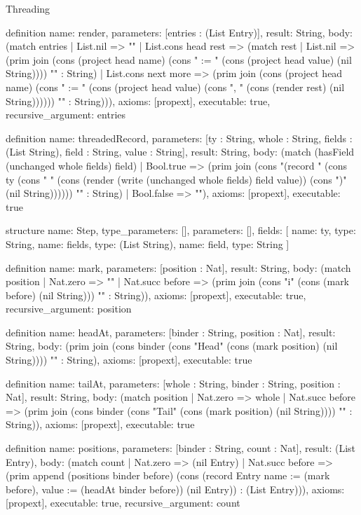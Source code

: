 \begin{lexlean}{Threading}
\begin{semanticmodule}
definition{
  name: render,
  parameters: [entries : (List Entry)],
  result: String,
  body: (match entries
    | List.nil => ""
    | List.cons head rest => (match rest
      | List.nil => (prim join (cons (project head name) (cons " := " (cons (project head value) (nil String)))) "" : String)
      | List.cons next more => (prim join (cons (project head name) (cons " := " (cons (project head value) (cons ", " (cons (render rest) (nil String)))))) "" : String))),
  axioms: [propext],
  executable: true,
  recursive_argument: entries
}

definition{
  name: threadedRecord,
  parameters: [ty : String, whole : String, fields : (List String), field : String, value : String],
  result: String,
  body: (match (hasField (unchanged whole fields) field)
    | Bool.true => (prim join (cons "(record " (cons ty (cons " {" (cons (render (write (unchanged whole fields) field value)) (cons "})" (nil String)))))) "" : String)
    | Bool.false => ""),
  axioms: [propext],
  executable: true
}

structure{
  name: Step,
  type_parameters: [],
  parameters: [],
  fields: [
    {name: ty, type: String},
    {name: fields, type: (List String)},
    {name: field, type: String}
  ]
}

definition{
  name: mark,
  parameters: [position : Nat],
  result: String,
  body: (match position
    | Nat.zero => ""
    | Nat.succ before => (prim join (cons "i" (cons (mark before) (nil String))) "" : String)),
  axioms: [propext],
  executable: true,
  recursive_argument: position
}

definition{
  name: headAt,
  parameters: [binder : String, position : Nat],
  result: String,
  body: (prim join (cons binder (cons "Head" (cons (mark position) (nil String)))) "" : String),
  axioms: [propext],
  executable: true
}

definition{
  name: tailAt,
  parameters: [whole : String, binder : String, position : Nat],
  result: String,
  body: (match position
    | Nat.zero => whole
    | Nat.succ before => (prim join (cons binder (cons "Tail" (cons (mark position) (nil String)))) "" : String)),
  axioms: [propext],
  executable: true
}

definition{
  name: positions,
  parameters: [binder : String, count : Nat],
  result: (List Entry),
  body: (match count
    | Nat.zero => (nil Entry)
    | Nat.succ before => (prim append (positions binder before) (cons (record Entry {name := (mark before), value := (headAt binder before)}) (nil Entry)) : (List Entry))),
  axioms: [propext],
  executable: true,
  recursive_argument: count
}


\end{semanticmodule}
\end{lexlean}
